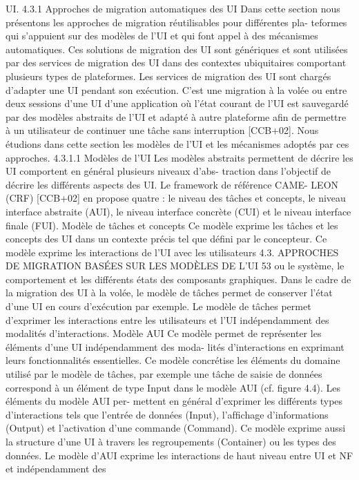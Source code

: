 \documentclass{article}
\begin{document}
UI.
4.3.1
Approches de migration automatiques des UI
Dans cette section nous présentons les approches de migration réutilisables pour différentes pla-
teformes qui s’appuient sur des modèles de l’UI et qui font appel à des mécanismes automatiques.
Ces solutions de migration des UI sont génériques et sont utilisées par des services de migration
des UI dans des contextes ubiquitaires comportant plusieurs types de plateformes. Les services de
migration des UI sont chargés d’adapter une UI pendant son exécution. C’est une migration à la volée
ou entre deux sessions d’une UI d’une application où l’état courant de l’UI est sauvegardé par des
modèles abstraits de l’UI et adapté à autre plateforme aﬁn de permettre à un utilisateur de continuer
une tâche sans interruption [CCB+02]. Nous étudions dans cette section les modèles de l’UI et les
mécanismes adoptés par ces approches.
4.3.1.1
Modèles de l’UI
Les modèles abstraits permettent de décrire les UI comportent en général plusieurs niveaux d’abs-
traction dans l’objectif de décrire les différents aspects des UI. Le framework de référence CAME-
LEON (CRF) [CCB+02] en propose quatre : le niveau des tâches et concepts, le niveau interface
abstraite (AUI), le niveau interface concrète (CUI) et le niveau interface ﬁnale (FUI).
Modèle de tâches et concepts
Ce modèle exprime les tâches et les concepts des UI dans un contexte
précis tel que déﬁni par le concepteur. Ce modèle exprime les interactions de l’UI avec les utilisateurs
4.3. APPROCHES DE MIGRATION BASÉES SUR LES MODÈLES DE L’UI
53
ou le système, le comportement et les différents états des composants graphiques. Dans le cadre de
la migration des UI à la volée, le modèle de tâches permet de conserver l’état d’une UI en cours
d’exécution par exemple. Le modèle de tâches permet d’exprimer les interactions entre les utilisateurs
et l’UI indépendamment des modalités d’interactions.
Modèle AUI
Ce modèle permet de représenter les éléments d’une UI indépendamment des moda-
lités d’interactions en exprimant leurs fonctionnalités essentielles. Ce modèle concrétise les éléments
du domaine utilisé par le modèle de tâches, par exemple une tâche de saisie de données correspond
à un élément de type Input dans le modèle AUI (cf. ﬁgure 4.4). Les éléments du modèle AUI per-
mettent en général d’exprimer les différents types d’interactions tels que l’entrée de données (Input),
l’afﬁchage d’informations (Output) et l’activation d’une commande (Command). Ce modèle exprime
aussi la structure d’une UI à travers les regroupements (Container) ou les types des données.
Le modèle d’AUI exprime les interactions de haut niveau entre UI et NF et indépendamment des
\end{document}
